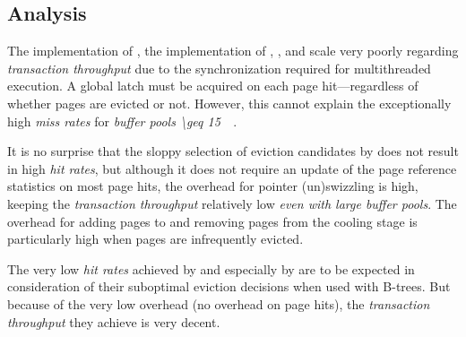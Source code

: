 
\subsection{Analysis} \label{subsec:page_evictioners_analysis}

    The  implementation of , the  implementation of , , and  scale very poorly regarding \emph{transaction throughput} due to the synchronization required for multithreaded execution. A global latch must be acquired on each page hit---regardless of whether pages are evicted or not. However, this cannot explain the exceptionally high \emph{miss rates} for \emph{buffer pools \SI{\geq 15}{\giga\byte}}.

    It is no surprise that the sloppy selection of eviction candidates by  does not result in high \emph{hit rates}, but although it does not require an update of the page reference statistics on most page hits, the overhead for pointer (un)swizzling is high, keeping the \emph{transaction throughput} relatively low \emph{even with large buffer pools}. The overhead for adding pages to and removing pages from the cooling stage is particularly high when pages are infrequently evicted.

    The very low \emph{hit rates} achieved by  and especially by  are to be expected in consideration of their suboptimal eviction decisions when used with B-trees. But because of the very low overhead (no overhead on page hits), the \emph{transaction throughput} they achieve is very decent.

